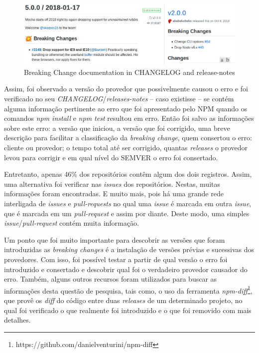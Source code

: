 \begin{figure}
    \centering
    \includegraphics[scale=0.45]{figuras/bc_documentation.jpeg}
    \caption{Breaking Change documentation in CHANGELOG and release-notes}
    \label{fig:bc_documentation}
\end{figure}{}

Assim, foi observado a versão do provedor que possivelmente causou o erro e foi verificado no seu \textit{CHANGELOG}/\textit{releases-notes} -- caso existisse -- se contém alguma informação pertinente ao erro que foi apresentado pelo \gls{NPM} quando os comandos \textit{npm install} e \textit{npm test} resultou em erro. Então foi salvo as informações sobre este erro: a versão que iniciou, a versão que foi corrigido, uma breve descrição para facilitar a classificação da \textit{breaking change}, quem consertou o erro: cliente ou provedor; o tempo total até ser corrigido, quantas \textit{releases} o provedor levou para corrigir e em qual nível do \gls{SEMVER} o erro foi consertado.

Entretanto, apenas 46\% dos repositórios contêm algum dos dois registros. Assim, uma alternativa foi verificar nas \textit{issues} dos repositórios. Nestas, muitas informações foram encontradas. E muito mais, pois há uma grande rede interligada de \textit{issues} e \textit{pull-requests} no qual uma \textit{issue} é marcada em outra \textit{issue}, que é marcada em um \textit{pull-request} e assim por diante. Deste modo, uma simples \textit{issue}/\textit{pull-request} contém muita informação.

Um ponto que foi muito importante para descobrir as versões que foram introduzidas as \textit{breaking changes} é a instalação de versões prévias e sucessivas dos provedores. Com isso, foi possível testar a partir de qual versão o erro foi introduzido e consertado e descobrir qual foi o verdadeiro provedor causador do erro. Também, alguns outros recursos foram utilizados para buscar as informações desta questão de pesquisa, tais como, o uso da ferramenta \textit{npm-diff}\footnote{https://github.com/danielventurini/npm-diff}, que provê os \textit{diff} do código entre duas \textit{releases} de um determinado projeto, no qual foi verificado o que realmente foi introduzido e o que foi removido com mais detalhes.

